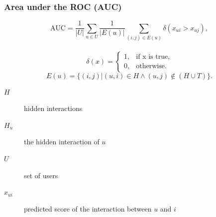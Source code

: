 \documentclass[mathserif,svgnames]{beamer}
\begin{document}
\begin{frame} 
    \frametitle{Area under the ROC (AUC)~\cite{Rendle:2009:BBP:1795114.1795167}}
\begin{equation} 
\text{AUC}=\frac{1}{|U|}\sum_{u \in U} \frac{1}{|E(u)|} 
\sum_{(i,j) \in E(u)} \delta(x_{ui}>x_{uj}),
\end{equation}\\
\begin{equation}
\delta(x)=\begin{cases}1, & \text{if x is true}, \\
                       0, & \text{otherwise.}
\end{cases}
\end{equation}
\begin{equation}
E(u) =\{(i,j)|(u,i) \in H \land (u,j) \not\in (H \cup T)\}.
\end{equation}
\begin{description}
    \item[$H$] hidden interactions\\
    \item[$H_u$] the hidden interaction of $u$\\
    \item[$U$] set of users
    \item[$x_{ui}$] predicted score of the interaction between $u$ and $i$
\end{description}
\end{frame}
\end{document}
